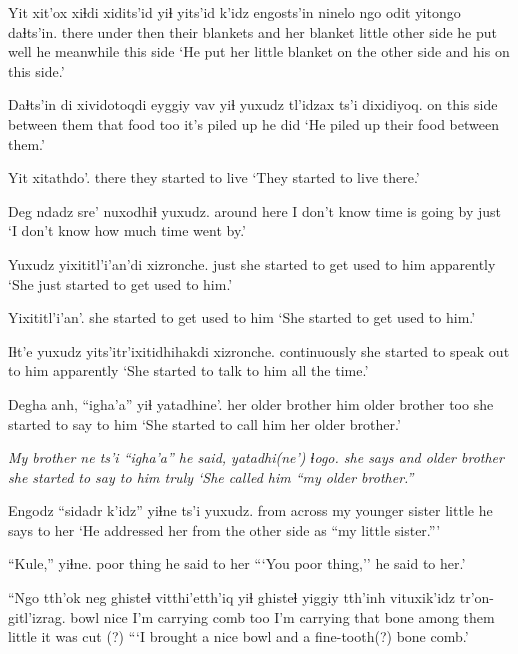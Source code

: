 \documentclass[12pt]{article}
\begin{document}
\gll Yit   xit'ox xiɬdi xidits'id yiɬ     yits'id    k'idz  engosts'in ninelo ngo odit yitongo daɬts'in.
there under  then  {their blankets} and {her blanket} little {other side} {he put} well he meanwhile {this side}
\glt `He put her little blanket on the other side and his on this side.'
\glend
               
\gll Daɬts'in   di  xividotoqdi eyggiy vav  yiɬ yuxudz  tl'idzax ts'i dixidiyoq.
{on this side} {} {between them} that food too {} {it's piled up} {}   {he did}
\glt `He piled up their food between them.'
\glend

\gll Yit   xitathdo'.
there {they started to live}
\glt `They started to live there.'
\glend

\gll Deg         {ndadz sre'}        nuxodhiɬ yuxudz.
{around here} {I don't know} {time is going by} just
\glt `I don't know how much time went by.'
\glend

\gll Yuxudz yixititl'i'an'di xizronche.
just     {she started to get used to him} apparently
\glt `She just started to get used to him.'
\glend

\gll Yixititl'i'an'.
{{she started to get used to him}}
\glt `She started to get used to him.'
\glend

\gll Iɬt'e        yuxudz yits'itr'ixitidhihakdi xizronche.
continuously  {}    {she started to speak out to him} apparently
\glt `She started to talk to him all the time.'
\glend

\gll Degha             anh, ``igha'a''           yiɬ yatadhine'.
{her older brother} him  {older brother} too {she started to say to him}
\glt `She started to call him her older brother.'
\glend

\gll \em{My brother} ne       ts'i ``igha'a''  \em{he said,} yatadhi(ne') ɬogo.
{}             {she says} and   {older brother} {} {she started to say to him} truly
\glt `She called him ``my older brother.''
\glend

\gll Engodz     ``sidadr           k'idz''  yiɬne          ts'i yuxudz.
{from across} {my younger sister} little {he says to her}
\glt `He addressed her from the other side as ``my little sister.'''
\glend

\gll ``Kule,''       yiɬne. 
{poor thing} {he said to her}
\glt ```You poor thing,'' he said to her.'
\glend

\gll ``Ngo tth'ok neg  ghisteɬ    vitthi'etth'iq yiɬ ghisteɬ   yiggiy tth'inh vituxik'idz       tr'on-gitl'izrag. 
{}  bowl   nice {I'm carrying} comb      too    {I'm carrying} that bone    {among them little} {it was cut (?)}
\glt ```I brought a nice bowl and a fine-tooth(?) bone comb.'
\glend
\end{document}
